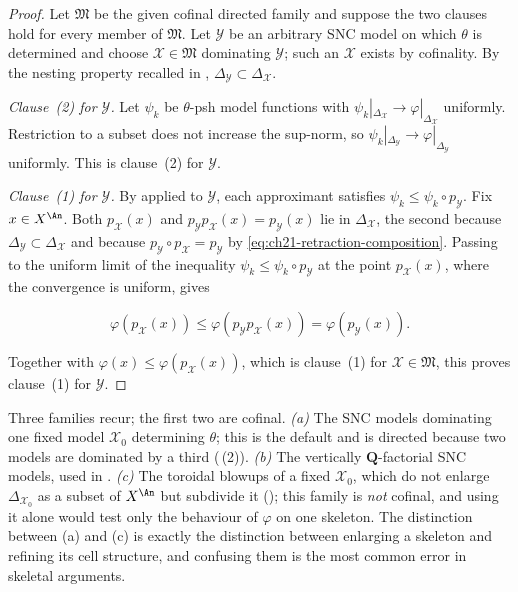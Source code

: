 \begin{proof}
Let $\mathfrak M$ be the given cofinal directed family and suppose the two
clauses hold for every member of $\mathfrak M$.  Let $\mathcal Y$ be an
arbitrary SNC model on which $\theta$ is determined and choose
$\mathcal X\in\mathfrak M$ dominating $\mathcal Y$; such an
$\mathcal X$ exists by cofinality.  By the nesting property recalled in
, $\Delta_{\mathcal Y}\subset\Delta_{\mathcal X}$.

\emph{Clause~(2) for $\mathcal Y$.}  Let $\psi_k$ be $\theta$-psh
model functions with
$\psi_k|_{\Delta_{\mathcal X}}\to\varphi|_{\Delta_{\mathcal X}}$
uniformly.  Restriction to a subset does not increase the sup-norm, so
$\psi_k|_{\Delta_{\mathcal Y}}\to\varphi|_{\Delta_{\mathcal Y}}$
uniformly.  This is clause~(2) for $\mathcal Y$.

\emph{Clause~(1) for $\mathcal Y$.}  By
 applied to $\mathcal Y$, each
approximant satisfies $\psi_k\leq\psi_k\circ p_{\mathcal Y}$.  Fix
$x\in X^{\An}$.  Both $p_{\mathcal X}(x)$ and
$p_{\mathcal Y}p_{\mathcal X}(x)=p_{\mathcal Y}(x)$ lie in
$\Delta_{\mathcal X}$, the second because
$\Delta_{\mathcal Y}\subset\Delta_{\mathcal X}$ and because
$p_{\mathcal Y}\circ p_{\mathcal X}=p_{\mathcal Y}$ by
\eqref{eq:ch21-retraction-composition}.  Passing to the uniform limit of the
inequality $\psi_k\leq\psi_k\circ p_{\mathcal Y}$ at the point
$p_{\mathcal X}(x)$, where the convergence is uniform, gives

\begin{equation}
\label{eq:ch21-cofinal-retractions}
 \varphi(p_{\mathcal X}(x))
 \leq
 \varphi(p_{\mathcal Y}p_{\mathcal X}(x))
 =\varphi(p_{\mathcal Y}(x)).
\end{equation}

Together with $\varphi(x)\leq\varphi(p_{\mathcal X}(x))$, which is
clause~(1) for $\mathcal X\in\mathfrak M$, this proves
clause~(1) for $\mathcal Y$.
\end{proof}

\begin{remark}
\label{rem:ch21-cofinal-families}
Three families recur; the first two are cofinal.  \emph{(a)} The SNC models dominating one
fixed model $\mathcal X_0$ determining $\theta$; this is the default and
is directed because two models are dominated by a third
(\,(2)).  \emph{(b)} The vertically
$\mathbf Q$-factorial SNC models, used in
.  \emph{(c)} The toroidal blowups of a fixed
$\mathcal X_0$, which do not enlarge $\Delta_{\mathcal X_0}$ as a subset
of $X^{\An}$ but subdivide it (); this
family is \emph{not} cofinal, and using it alone would test only the
behaviour of $\varphi$ on one skeleton.  The distinction between (a) and
(c) is exactly the distinction between enlarging a skeleton and refining
its cell structure, and confusing them is the most common error in
skeletal arguments.
\end{remark}

